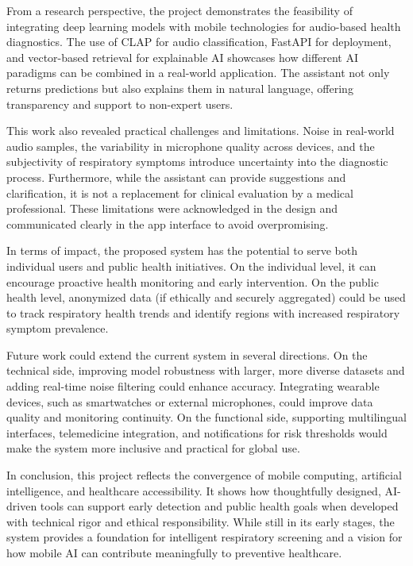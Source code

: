From a research perspective, the project demonstrates the feasibility of integrating deep learning models with mobile technologies for audio-based health diagnostics. The use of CLAP for audio classification, FastAPI for deployment, and vector-based retrieval for explainable AI showcases how different AI paradigms can be combined in a real-world application. The assistant not only returns predictions but also explains them in natural language, offering transparency and support to non-expert users.

This work also revealed practical challenges and limitations. Noise in real-world audio samples, the variability in microphone quality across devices, and the subjectivity of respiratory symptoms introduce uncertainty into the diagnostic process. Furthermore, while the assistant can provide suggestions and clarification, it is not a replacement for clinical evaluation by a medical professional. These limitations were acknowledged in the design and communicated clearly in the app interface to avoid overpromising.

In terms of impact, the proposed system has the potential to serve both individual users and public health initiatives. On the individual level, it can encourage proactive health monitoring and early intervention. On the public health level, anonymized data (if ethically and securely aggregated) could be used to track respiratory health trends and identify regions with increased respiratory symptom prevalence.

Future work could extend the current system in several directions. On the technical side, improving model robustness with larger, more diverse datasets and adding real-time noise filtering could enhance accuracy. Integrating wearable devices, such as smartwatches or external microphones, could improve data quality and monitoring continuity. On the functional side, supporting multilingual interfaces, telemedicine integration, and notifications for risk thresholds would make the system more inclusive and practical for global use.

In conclusion, this project reflects the convergence of mobile computing, artificial intelligence, and healthcare accessibility. It shows how thoughtfully designed, AI-driven tools can support early detection and public health goals when developed with technical rigor and ethical responsibility. While still in its early stages, the system provides a foundation for intelligent respiratory screening and a vision for how mobile AI can contribute meaningfully to preventive healthcare.
